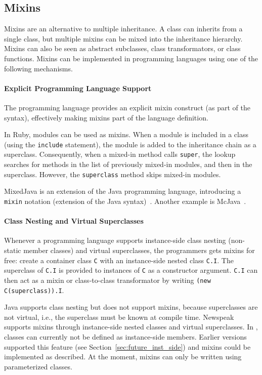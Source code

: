 \subsection{Mixins}
\label{sec:rel_mixins1}
Mixins are an alternative to multiple inheritance. A class can inherits from a single class, but multiple mixins can be mixed into the inheritance hierarchy. Mixins can also be seen as abstract subclasses, class transformators, or class functions. Mixins can be implemented in programming languages using one of the following mechanisms.

\paragraph{Explicit Programming Language Support}
The programming language provides an explicit mixin construct (as part of the syntax), effectively making mixins part of the language definition.

In Ruby, modules can be used as mixins. When a module is included in a class (using the \texttt{include} statement), the module is added to the inheritance chain as a superclass. Consequently, when a mixed-in method calls \texttt{super}, the lookup searches for methods in the list of previously mixed-in modules, and then in the superclass. However, the \texttt{superclass} method skips mixed-in modules.

MixedJava is an extension of the Java programming language, introducing a \texttt{mixin} notation (extension of the Java syntax)~\cite{Flatt:1998:CM:268946.268961}. Another example is McJava~\cite{mcjava}.

\paragraph{Class Nesting and Virtual Superclasses}
Whenever a programming language supports instance-side class nesting (non-static member classes) and virtual superclasses, the programmers gets mixins for free: create a container class \texttt{C} with an instance-side nested class \texttt{C.I}. The superclass of \texttt{C.I} is provided to instances of \texttt{C} as a constructor argument. \texttt{C.I} can then act as a mixin or class-to-class transformator by writing \texttt{(new C(superclass)).I}.

Java supports class nesting but does not support mixins, because superclasses are not virtual, i.e., the superclass must be known at compile time. Newspeak supports mixins through instance-side nested classes and virtual superclasses. In \msname, classes can currently not be defined as instance-side members. Earlier versions \msname supported this feature (see Section~\ref{sec:future_inst_side}) and mixins could be implemented as described. At the moment, mixins can only be written using parameterized classes. 

